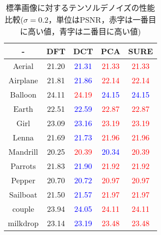 \begin{table}[h]
\caption{標準画像に対するテンソルデノイズの性能比較($\sigma=0.2$，単位はPSNR，赤字は一番目に高い値，青字は二番目に高い値)}
\label{tab:settings}
\centering
\begin{tabular}{c||c|c|c||c}\hline
- & DFT & DCT & PCA & SURE\\\hline
Aerial & 21.20 & \textcolor{blue}{21.31} & \textcolor{red}{21.33} & \textcolor{red}{21.33}\\\hline
Airplane & 21.81 & \textcolor{blue}{21.86} & \textcolor{red}{22.14}& \textcolor{red}{22.14}\\\hline
Balloon & 24.11 & \textcolor{red}{24.19} & \textcolor{blue}{24.15} & \textcolor{blue}{24.15} \\\hline
Earth & 22.51 & \textcolor{blue}{22.59} & \textcolor{red}{22.87} & \textcolor{red}{22.87}  \\\hline
Girl & 23.09 & \textcolor{blue}{23.16} & \textcolor{red}{23.19} & \textcolor{red}{23.19}  \\\hline
Lenna & 21.69 & \textcolor{blue}{21.73} & \textcolor{red}{21.96} & \textcolor{red}{21.96} \\\hline
Mandrill &20.25 & \textcolor{red}{20.39} & \textcolor{blue}{20.34} & \textcolor{red}{20.39}  \\\hline
Parrots & 21.83 & \textcolor{blue}{21.90} & \textcolor{red}{21.92}  & \textcolor{red}{21.92}  \\\hline
Pepper & 20.70 & \textcolor{blue}{20.72} & \textcolor{red}{20.97} & \textcolor{red}{20.97}  \\\hline
Sailboat & 21.50 & \textcolor{blue}{21.57} & \textcolor{red}{21.97} & \textcolor{red}{21.97}  \\\hline
couple & 23.94 & \textcolor{blue}{24.05} & \textcolor{red}{24.11} & \textcolor{red}{24.11}  \\\hline
milkdrop &23.14 & \textcolor{blue}{23.19} & \textcolor{red}{23.48} & \textcolor{red}{23.48} \\\hline


\end{tabular}
\end{table}

